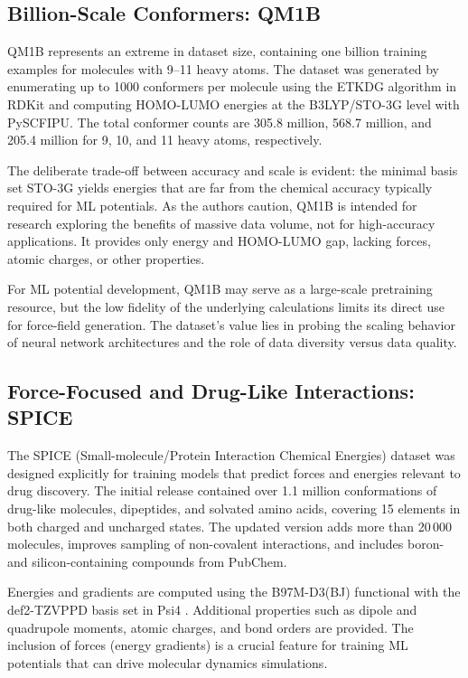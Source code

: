 \documentclass[12pt]{article}
\begin{document}
\subsection{Billion-Scale Conformers: QM1B}

QM1B \cite{ds11-31} represents an extreme in dataset size, containing one billion training examples for molecules with 9–11 heavy atoms. The dataset was generated by enumerating up to 1000 conformers per molecule using the ETKDG algorithm in RDKit \cite{ds11-97} and computing HOMO-LUMO energies at the B3LYP/STO-3G level with PySCFIPU. The total conformer counts are 305.8 million, 568.7 million, and 205.4 million for 9, 10, and 11 heavy atoms, respectively.

The deliberate trade-off between accuracy and scale is evident: the minimal basis set STO-3G yields energies that are far from the chemical accuracy typically required for ML potentials. As the authors caution, QM1B is intended for research exploring the benefits of massive data volume, not for high-accuracy applications. It provides only energy and HOMO-LUMO gap, lacking forces, atomic charges, or other properties.

For ML potential development, QM1B may serve as a large-scale pretraining resource, but the low fidelity of the underlying calculations limits its direct use for force-field generation. The dataset’s value lies in probing the scaling behavior of neural network architectures and the role of data diversity versus data quality.

\subsection{Force-Focused and Drug-Like Interactions: SPICE}

The SPICE (Small-molecule/Protein Interaction Chemical Energies) dataset \cite{ds12-43,ds12-44} was designed explicitly for training models that predict forces and energies relevant to drug discovery. The initial release contained over 1.1 million conformations of drug-like molecules, dipeptides, and solvated amino acids, covering 15 elements in both charged and uncharged states. The updated version adds more than 20\,000 molecules, improves sampling of non-covalent interactions, and includes boron- and silicon-containing compounds from PubChem.

Energies and gradients are computed using the B97M-D3(BJ) functional \cite{ds12-100} with the def2-TZVPPD basis set \cite{ds12-92} in Psi4 \cite{ds12-99}. Additional properties such as dipole and quadrupole moments, atomic charges, and bond orders are provided. The inclusion of forces (energy gradients) is a crucial feature for training ML potentials that can drive molecular dynamics simulations.
\end{document}
